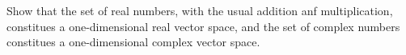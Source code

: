 Show that the set of real numbers, with the usual addition anf multiplication, constitues a
one-dimensional real vector space, and the set of complex numbers constitues a one-dimensional complex
vector space.\\